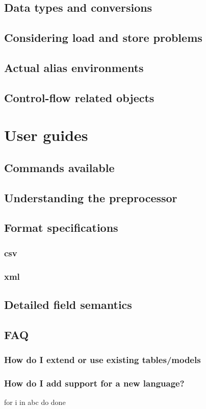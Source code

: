     \section{Data types and conversions}

    \section{Considering load and store problems} 

    \section{Actual alias environments} 
      

    \section{Control-flow related objects} 


\chapter{User guides}

    \section{Commands available}

    \section{Understanding the preprocessor}

    \section{Format specifications}

        \subsection{csv}

        \subsection{xml}

    \section{Detailed field semantics}

    \section{FAQ}
        \subsection{How do I extend or use existing tables/models}

        \subsection{How do I add support for a new language?}

\begin{code}
for i in abc
do
done
\end{code}




